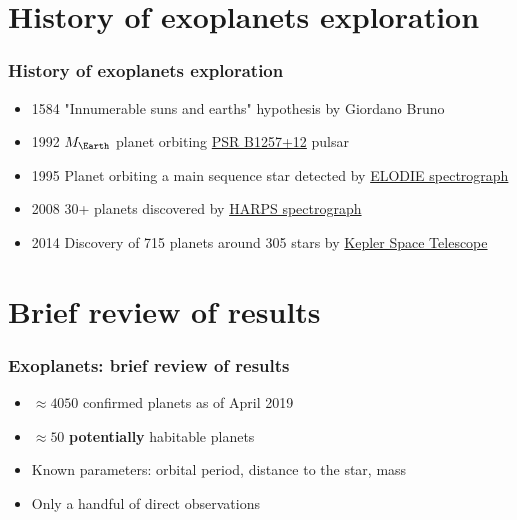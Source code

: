 \documentclass[aspectratio=169]{beamer}
\begin{document}
\section{History of exoplanets exploration}
\begin{frame}
\frametitle{History of exoplanets exploration}
\begin{itemize}
\item 1584 "Innumerable suns and earths" hypothesis by Giordano Bruno
\item 1992 $M_\Earth$ planet orbiting \href{https://en.wikipedia.org/wiki/PSR_B1257\%2B12}{PSR B1257+12} pulsar
\item 1995 Planet orbiting a main sequence star detected by
      \href{http://www.obs-hp.fr/guide/elodie/elodie-eng.html}{ELODIE spectrograph}
\item 2008 30+ planets discovered by \href{http://www.eso.org/sci/facilities/lasilla/instruments/harps.html}{HARPS spectrograph}
\item 2014 Discovery of 715 planets around 305 stars by %
      \href{http://www.nasa.gov/mission_pages/kepler/main/index.html}{Kepler Space Telescope}
\end{itemize}
\end{frame}


\section{Brief review of results}
\begin{frame}
\frametitle{Exoplanets: brief review of results}
\begin{itemize}
\item $\approx 4050$ confirmed planets as of April 2019 \cite{exoplanet.eu}
\item $\approx 50$ {\bf potentially} habitable planets
\item Known parameters: orbital period, distance to the star, mass
\item Only a handful of direct observations
\end{itemize}
\end{frame}
\end{document}
